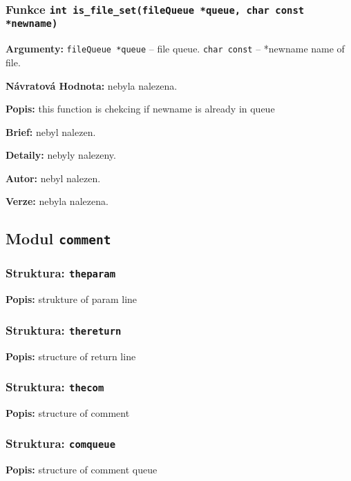 \documentclass[12pt, a4paper]{article}
\begin{document}
\subsubsection{Funkce \texttt{int is\_file\_set(fileQueue *queue, char const *newname)}}
\textbf{Argumenty: }\verb"fileQueue *queue" -- file queue. \verb"char const" -- *newname name of file. \\
\par\noindent
\textbf{Návratová Hodnota: }nebyla nalezena.\\
\par\noindent
\textbf{Popis: }this function is chekcing if newname is already in queue\\
\par\noindent
\textbf{Brief: }nebyl nalezen.\\
\par\noindent
\textbf{Detaily: }nebyly nalezeny.\\
\par\noindent
\textbf{Autor: }nebyl nalezen.\\
\par\noindent
\textbf{Verze: }nebyla nalezena.\\
\par\noindent
\subsection{Modul \texttt{comment}}
\subsubsection{Struktura: \texttt{theparam }}
\textbf{Popis: }strukture of param line \\
\par\noindent
\subsubsection{Struktura: \texttt{thereturn }}
\textbf{Popis: }structure of return line\\
\par\noindent
\subsubsection{Struktura: \texttt{thecom }}
\textbf{Popis: }structure of comment \\
\par\noindent
\subsubsection{Struktura: \texttt{comqueue }}
\textbf{Popis: }structure of comment queue\\
\par\noindent
\end{document}
